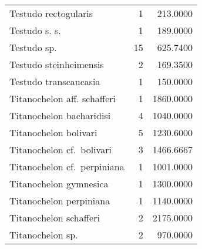 \begin{longtable}[]{@{}lrr@{}}
	Testudo rectogularis & 1 & 213.0000\tabularnewline
	Testudo s. s. & 1 & 189.0000\tabularnewline
	Testudo sp. & 15 & 625.7400\tabularnewline
	Testudo steinheimensis & 2 & 169.3500\tabularnewline
	Testudo transcaucasia & 1 & 150.0000\tabularnewline
	Titanochelon aff. schafferi & 1 & 1860.0000\tabularnewline
	Titanochelon bacharidisi & 4 & 1040.0000\tabularnewline
	Titanochelon bolivari & 5 & 1230.6000\tabularnewline
	Titanochelon cf.~bolivari & 3 & 1466.6667\tabularnewline
	Titanochelon cf.~perpiniana & 1 & 1001.0000\tabularnewline
	Titanochelon gymnesica & 1 & 1300.0000\tabularnewline
	Titanochelon perpiniana & 1 & 1140.0000\tabularnewline
	Titanochelon schafferi & 2 & 2175.0000\tabularnewline
	Titanochelon sp. & 2 & 970.0000\tabularnewline
	\bottomrule
\end{longtable}